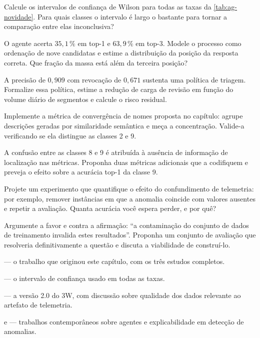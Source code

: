 \begin{exercicios}
\item Calcule os intervalos de confiança de Wilson para todas as taxas da
      \cref{tab:ag-novidade}. Para quais classes o intervalo é largo o bastante para
      tornar a comparação entre elas inconclusiva?

\item O agente acerta $35{,}1\,\%$ em top-1 e $63{,}9\,\%$ em top-3. Modele o processo
      como ordenação de nove candidatas e estime a distribuição da posição da resposta
      correta. Que fração da massa está além da terceira posição?

\item A precisão de $0{,}909$ com revocação de $0{,}671$ sustenta uma política de
      triagem. Formalize essa política, estime a redução de carga de revisão em função do
      volume diário de segmentos e calcule o risco residual.

\item Implemente a métrica de convergência de nomes proposta no capítulo: agrupe
      descrições geradas por similaridade semântica e meça a concentração. Valide-a
      verificando se ela distingue as classes 2 e 9.

\item A confusão entre as classes 8 e 9 é atribuída à ausência de informação de
      localização nas métricas. Proponha duas métricas adicionais que a codifiquem e
      preveja o efeito sobre a acurácia top-1 da classe 9.

\item Projete um experimento que quantifique o efeito do confundimento de telemetria:
      por exemplo, remover instâncias em que a anomalia coincide com valores ausentes e
      repetir a avaliação. Quanta acurácia você espera perder, e por quê?

\item Argumente a favor e contra a afirmação: ``a contaminação do conjunto de dados de
      treinamento invalida estes resultados''. Proponha um conjunto de avaliação que
      resolveria definitivamente a questão e discuta a viabilidade de construí-lo.
\end{exercicios}

\begin{leituras}
\item \citet{Lopes2026LLM} --- o trabalho que originou este capítulo, com os três estudos
      completos.
\item \citet{Wilson1927} --- o intervalo de confiança usado em todas as taxas.
\item \citet{VazVargas2026_3w2} --- a versão 2.0 do 3W, com discussão sobre qualidade dos
      dados relevante ao artefato de telemetria.
\item \citet{Sharma2025xaiagents} e \citet{Belay2026agenticAD} --- trabalhos
      contemporâneos sobre agentes e explicabilidade em detecção de anomalias.
\end{leituras}

